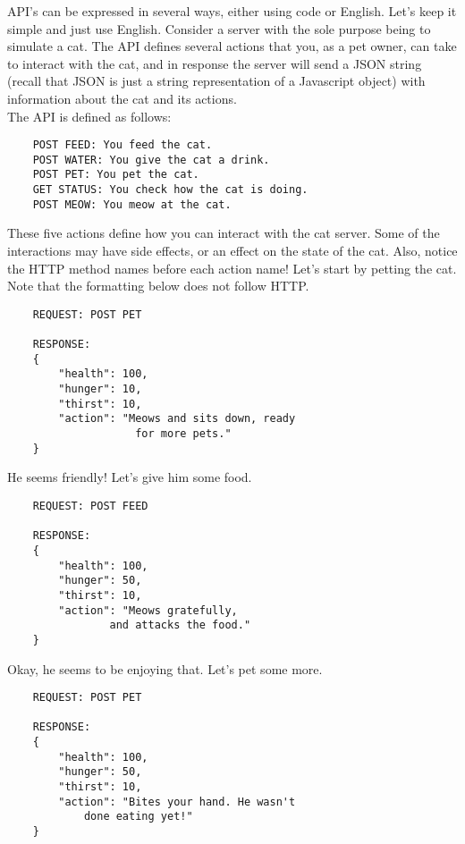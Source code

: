 \begin{kaobox}[title=Let's take a look at an example of a simple API.]
    
    API's can be expressed in several ways, either using code or English. Let's keep it simple and just use English. Consider a server with the sole purpose being to simulate a cat. The API defines several actions that you, as a pet owner, can take to interact with the cat, and in response the server will send a JSON string (recall that JSON is just a string representation of a Javascript object) with information about the cat and its actions. \\

    The API is defined as follows:
    \begin{verbatim}
    POST FEED: You feed the cat.
    POST WATER: You give the cat a drink.
    POST PET: You pet the cat.
    GET STATUS: You check how the cat is doing.
    POST MEOW: You meow at the cat.
    \end{verbatim}

    These five actions define how you can interact with the cat server. Some of the interactions may have side effects, or an effect on the state of the cat. Also, notice the HTTP method names before each action name! Let's start by petting the cat. Note that the formatting below does not follow HTTP.

    \begin{verbatim}
    REQUEST: POST PET

    RESPONSE: 
    {
        "health": 100,
        "hunger": 10,
        "thirst": 10,
        "action": "Meows and sits down, ready 
                    for more pets."
    }
    \end{verbatim}

    He seems friendly! Let's give him some food.

    \begin{verbatim}
    REQUEST: POST FEED

    RESPONSE: 
    {
        "health": 100,
        "hunger": 50,
        "thirst": 10,
        "action": "Meows gratefully, 
                and attacks the food."
    }
    \end{verbatim}

    Okay, he seems to be enjoying that. Let's pet some more.
    \begin{verbatim}
    REQUEST: POST PET

    RESPONSE: 
    {
        "health": 100,
        "hunger": 50,
        "thirst": 10,
        "action": "Bites your hand. He wasn't 
            done eating yet!"
    }
    \end{verbatim}


\end{kaobox}
